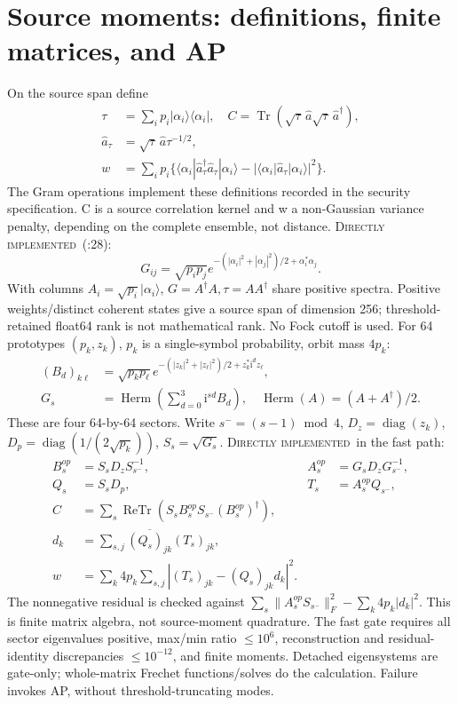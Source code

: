 \documentclass[11pt]{article}
\newcommand{\src}[2]{\texttt{\detokenize{#1}}:#2}
\newcommand{\DI}{\textsc{Directly implemented}}
\newcommand{\Tr}{\operatorname{Tr}}
\begin{document}
\section{Source moments: definitions, finite matrices, and AP}
On the source span define
\begin{align}
\tau&=\sum_i p_i|\alpha_i\rangle\langle\alpha_i|,\quad
C=\Tr(\sqrt\tau\,\hat a\sqrt\tau\,\hat a^\dagger),\\
\hat a_\tau&=\sqrt\tau\,\hat a\tau^{-1/2},\\
w&=\sum_i p_i\{\langle\alpha_i|\hat a_\tau^\dagger\hat a_\tau|\alpha_i\rangle
-|\langle\alpha_i|\hat a_\tau|\alpha_i\rangle|^2\}.
\end{align}
The Gram operations implement these definitions recorded in the security
specification. C is a source correlation kernel and w a non-Gaussian variance
penalty, depending on the complete ensemble, not distance.
\DI\ (\src{src/cvqkd/gram_moments.py}{28}):
\begin{equation}
G_{ij}=\sqrt{p_ip_j}e^{-(|\alpha_i|^2+|\alpha_j|^2)/2+\alpha_i^*\alpha_j}.
\end{equation}
With columns $A_i=\sqrt{p_i}|\alpha_i\rangle$, $G=A^\dagger A,\tau=AA^\dagger$
share positive spectra. Positive weights/distinct coherent states give a source span of dimension 256;
threshold-retained float64 rank is not mathematical rank. No Fock cutoff is used.
For 64 prototypes $(p_k,z_k)$, $p_k$ is a single-symbol probability, orbit mass $4p_k$:
\begin{align}
(B_d)_{k\ell}&=\sqrt{p_kp_\ell}e^{-(|z_k|^2+|z_\ell|^2)/2+z_k^*\mathrm i^dz_\ell},\\
G_s&=\operatorname{Herm}\left(\sum_{d=0}^3\mathrm i^{sd}B_d\right),\quad
\operatorname{Herm}(A)=(A+A^\dagger)/2.
\end{align}
These are four 64-by-64 sectors. Write $s^-=(s-1)\bmod4$,
$D_z=\operatorname{diag}(z_k)$, $D_p=\operatorname{diag}(1/(2\sqrt{p_k}))$,
$S_s=\sqrt{G_s}$. \DI\ in the fast path:
\begin{align}
B_s^{op}&=S_sD_zS_{s^-}^{-1},&A_s^{op}&=G_sD_zG_{s^-}^{-1},\\
Q_s&=S_sD_p,&T_s&=A_s^{op}Q_{s^-},\\
C&=\sum_s\operatorname{ReTr}(S_sB_s^{op}S_{s^-}(B_s^{op})^\dagger),\\
d_k&=\sum_{s,j}\overline{(Q_s)_{jk}}(T_s)_{jk},\\
w&=\sum_k4p_k\sum_{s,j}|(T_s)_{jk}-(Q_s)_{jk}d_k|^2.
\end{align}
The nonnegative residual is checked against
$\sum_s\|A_s^{op}S_{s^-}\|_F^2-\sum_k4p_k|d_k|^2$.
This is finite matrix algebra, not source-moment quadrature.
The fast gate requires all sector eigenvalues positive, max/min ratio $\le10^6$,
reconstruction and residual-identity discrepancies $\le10^{-12}$, and finite moments.
Detached eigensystems are gate-only; whole-matrix Frechet functions/solves do
the calculation. Failure invokes AP, without threshold-truncating modes.
\end{document}
